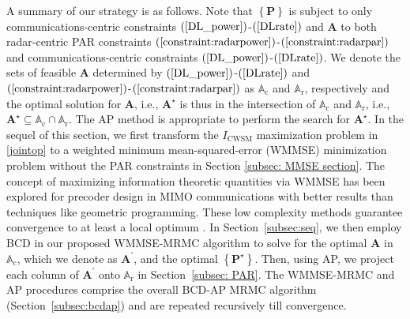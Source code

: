 \documentclass[10pt,journal]{IEEEtran}
\newcommand{\paren}[1]{\left({#1}\right)}
\newcommand{\braces}[1]{{\left\{ {#1}\right\}}}
\theoremstyle{definition}
\begin{document}
	
	A summary of our strategy is as follows. Note that ${\braces{\mathbf{P}}}$ is subject to only communications-centric constraints $\paren{\mathrm{\ref{DL_power}}}$-$\paren{\mathrm{\ref{DLrate}}}$ and $\mathbf{A}$ to both radar-centric PAR constraints $\paren{\mathrm{\ref{constraint:radarpower}}}$-$\paren{\mathrm{\ref{constraint:radarpar}}}$ and communications-centric constraints $\paren{\mathrm{\ref{DL_power}}}$-$\paren{\mathrm{\ref{DLrate}}}$. %
	We denote the sets of feasible $\mathbf{A}$ determined by $\paren{\mathrm{\ref{DL_power}}}$-$\paren{\mathrm{\ref{DLrate}}}$ and $\paren{\mathrm{\ref{constraint:radarpower}}}$-$\paren{\mathrm{\ref{constraint:radarpar}}}$ as $\mathbb{A}_{\textrm{c}}$ and $\mathbb{A}_{\textrm{r}}$, respectively and the optimal solution for $\mathbf{A}$, i.e., $\mathbf{A}^\star$ is thus in the intersection of $\mathbb{A}_{\textrm{c}}$ and $\mathbb{A}_{\textrm{r}}$, i.e., $\mathbf{A}^\star\subseteq\mathbb{A}_{\textrm{c}}\cap\mathbb{A}_{\textrm{r}}$. The AP method \cite{arXiv180203889Z,nearestvector} is appropriate to perform the search for $\mathbf{A}^\star$. In the sequel of this section, we first transform the $I_{\textrm{CWSM}}$ maximization problem in \eqref{jointop} to a weighted minimum mean-squared-error (WMMSE) minimization problem without the PAR constraints in Section \ref{subsec: MMSE section}. The concept of maximizing information theoretic quantities via WMMSE has been explored for precoder design in MIMO communications \cite{Luo2011IterativeWMMSE,FD_WMMSE} with better results than techniques like  geometric programming. These low complexity methods guarantee convergence to at least a local optimum \cite{Luo2011IterativeWMMSE}. In Section~\ref{subsec:seq}, we then employ BCD in our proposed WMMSE-MRMC algorithm to solve for the optimal $\mathbf{A}$ in $\mathbb{A}_{\textrm{c}}$, which we denote as $\mathbf{A}^\prime$, and the optimal %
	$\braces{\mathbf{P}^\star}$. %
	Then, using AP, we project each column of $\mathbf{A}^\prime$ onto $\mathbb{A}_{\textrm{r}}$ in Section~\ref{subsec: PAR}. The WMMSE-MRMC and AP procedures comprise the overall BCD-AP MRMC algorithm (Section~\ref{subsec:bcdap}) and are repeated recursively till convergence.
	
\end{document}
